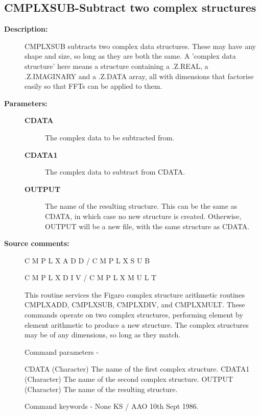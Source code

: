 \subsection{CMPLXSUB-\label{CMPLXSUB}Subtract two complex structures}
\begin{description}

\item [\textbf{Description:}]
 CMPLXSUB  subtracts two complex data  structures.  These  may
 have any shape and size, so long as they are both the same.  A
 'complex data structure' here means a structure containing a
 .Z.REAL, a .Z.IMAGINARY and a .Z.DATA array, all with dimensions
 that factorise easily so that FFTs can be applied to them.

\item [\textbf{Parameters:}]
\begin{description}
\item [\textbf{CDATA}]
 The complex data to be subtracted from.
\item [\textbf{CDATA1}]
 The complex data to subtract from CDATA.
\item [\textbf{OUTPUT}]
 The name of the resulting structure. This can be the same as
 CDATA, in which case no new structure is created.  Otherwise,
 OUTPUT will be a new file, with the same structure as CDATA.
\end{description}

\item [\textbf{Source comments:}]
\begin{terminalv}
 C M P L X A D D   /   C M P L X S U B

 C M P L X D I V   /   C M P L X M U L T

 This routine services the Figaro complex structure arithmetic
 routines CMPLXADD, CMPLXSUB, CMPLXDIV, and CMPLXMULT.  These
 commands operate on two complex structures, performing element
 by element arithmetic to produce a new structure.  The complex
 structures may be of any dimensions, so long as they match.

 Command parameters -

 CDATA    (Character) The name of the first complex structure.
 CDATA1   (Character) The name of the second complex structure.
 OUTPUT   (Character) The name of the resulting structure.

 Command keywords - None
                                     KS / AAO  10th Sept 1986.
\end{terminalv}
\end{description}
